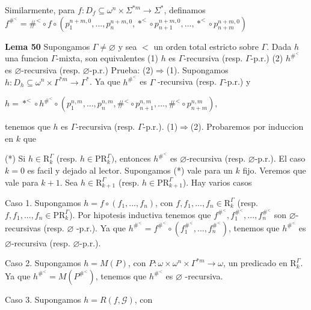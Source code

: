 Similarmente, para \(f:D_{f}\subseteq \omega ^{n}\times \Sigma ^{\ast m}\rightarrow \Sigma ^{\ast }\), definamos
\(\displaystyle f^{\#^{< }}=\#^{< }\circ f\circ \left( p_{1}^{n+m,0},...,p_{n}^{n+m,0},\ast ^{< }\circ p_{n+1}^{n+m,0},...,\ast ^{< }\circ p_{n+m}^{n+m,0}\right) \)




\textbf{Lema 50} Supongamos \(\Gamma \neq \varnothing \) y sea \(< \) un orden total estricto sobre \( \Gamma \). Dada \(h\) una funcion \(\Gamma \)-mixta, son equivalentes
(1) \(h\) es \(\Gamma \)-recursiva (resp. \(\Gamma \)-p.r.)
(2) \(h^{\#^{< }}\) es \(\varnothing \)-recursiva (resp. \(\varnothing \)-p.r.)
Prueba: (2)\(\Rightarrow \)(1). Supongamos \(h:D_{h}\subseteq \omega ^{n}\times \Gamma ^{\ast m}\rightarrow \Gamma ^{\ast }\). Ya que \(h^{\#^{< }}\) es \(\Gamma \) -recursiva (resp. \(\Gamma \)-p.r.) y

\(\displaystyle h=\ast ^{< }\circ h^{\#^{< }}\circ \left( p_{1}^{n,m},...,p_{n}^{n,m},\#^{< }\circ p_{n+1}^{n,m},...,\#^{< }\circ p_{n+m}^{n,m}\right) \text{,} \)

tenemos que \(h\) es \(\Gamma \)-recursiva (resp. \(\Gamma \)-p.r.).
(1)\(\Rightarrow \)(2). Probaremos por induccion en \(k\) que

(*) Si \(h\in \mathrm{R}_{k}^{\Gamma }\) (resp. \(h\in \mathrm{PR} _{k}^{\Gamma })\), entonces \(h^{\#^{< }}\) es \(\varnothing \)-recursiva (resp. \( \varnothing \)-p.r.).
El caso \(k=0\) es facil y dejado al lector. Supongamos (*) vale para un \(k\) fijo. Veremos que vale para \(k+1\). Sea \(h\in \mathrm{R} _{k+1}^{\Gamma }\) (resp. \(h\in \mathrm{PR}_{k+1}^{\Gamma }\)). Hay varios casos

Caso 1. Supongamos \(h=f\circ (f_{1},...,f_{n})\), con \(f,f_{1},...,f_{n}\in \mathrm{R}_{k}^{\Gamma }\) (resp. \(f,f_{1},...,f_{n}\in \mathrm{PR} _{k}^{\Gamma }\)). Por hipotesis inductiva tenemos que \(f^{\#^{< }},f_{1}^{ \#^{< }},...,f_{n}^{\#^{< }}\) son \(\varnothing \)-recursivas (resp. \(\varnothing \) -p.r.). Ya que \(h^{\#^{< }}=f^{\#^{< }}\circ \left( f_{1}^{\#^{< }},...,f_{n}^{\#^{< }}\right) \), tenemos que \(h^{\#^{< }}\) es \( \varnothing \)-recursiva (resp. \(\varnothing \)-p.r.).

Caso 2. Supongamos \(h=M(P)\), con \(P:\omega \times \omega ^{n}\times \Gamma ^{\ast m}\rightarrow \omega \), un predicado en \(\mathrm{R}_{k}^{\Gamma }\). Ya que \(h^{\#^{< }}=M(P^{\#^{< }})\), tenemos que \(h^{\#^{< }}\) es \(\varnothing \) -recursiva.

Caso 3. Supongamos \(h=R(f,\mathcal{G})\), con

